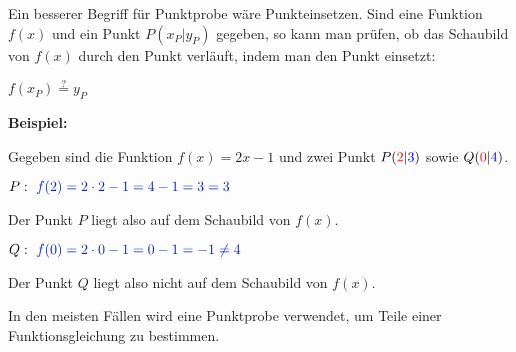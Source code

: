 Ein besserer Begriff für Punktprobe wäre Punkteinsetzen. Sind eine Funktion \(f(x)\) und ein Punkt \(P(x_P\vert y_P)\) gegeben, so kann man prüfen, ob das Schaubild von \(f(x)\) durch den Punkt verläuft, indem man den Punkt einsetzt:
\begin{tcolorbox}
	\centering
	\textcolor{loestc}{\(f(x_P)\overset{?}{=}y_P\)}
\end{tcolorbox}

\textbf{Beispiel:}

Gegeben sind die Funktion \(f(x)=2x-1\) und zwei Punkt \(P(\textcolor{red}{2}\vert\textcolor{blue}{3})\) sowie \(Q(\textcolor{red}{0}\vert\textcolor{blue}{4})\).

\(P:\ \textcolor{loes}{f(2)=2\cdot 2-1=4-1=3=3}\)

Der Punkt \(P\) liegt also auf dem Schaubild von \(f(x)\).

\(Q:\ \textcolor{loes}{f(0)=2\cdot 0-1=0-1=-1\neq4}\)

Der Punkt \(Q\) liegt also nicht auf dem Schaubild von \(f(x)\).

In den meisten Fällen wird eine Punktprobe verwendet, um Teile einer Funktionsgleichung zu bestimmen.

